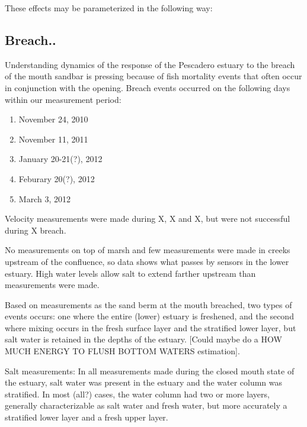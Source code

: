 These effects may be parameterized in the following way:



\subsection{Breach.. } \label{breach_dynamics}
Understanding dynamics of the response of the Pescadero estuary to the breach of the mouth sandbar is pressing because of fish mortality events that often occur in conjunction with the opening. Breach events occurred on the following days within our measurement period:
\begin{enumerate}
	\item November 24, 2010
	\item November 11, 2011
	\item January 20-21(?), 2012
	\item Feburary 20(?), 2012
	\item March 3, 2012
\end{enumerate}

Velocity measurements were made during X, X and X, but were not successful during X breach. 

No measurements on top of marsh and few measurements were made in
creeks upstream of the confluence, so data shows what passes by sensors in the lower estuary. High water
levels allow salt to extend farther upstream than measurements were made.

Based on measurements as the sand berm at the mouth breached, two types
of events occurs: one where the entire (lower) estuary is freshened, and
the second where mixing occurs in the fresh surface layer and the
stratified lower layer, but salt water is retained in the depths of the
estuary. [Could maybe do a HOW MUCH ENERGY TO FLUSH BOTTOM WATERS
estimation].


Salt measurements:
In all measurements made during the closed mouth state of the estuary, salt water was present in the estuary and the water column was stratified. In most (all?) cases, the water column had two or more layers, generally characterizable as salt water and fresh water, but more accurately a stratified lower layer and a fresh upper layer. 








